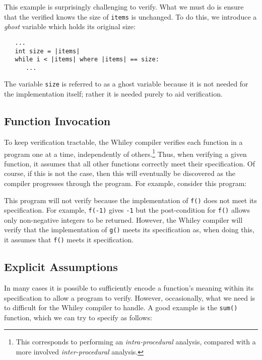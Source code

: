 

This example is surprisingly challenging to verify.  What we must do
is ensure that the verified knows the size of \lstinline{items} is
unchanged.  To do this, we introduce a {\em ghost} variable which
holds its original size:

\begin{lstlisting}
   ...
   int size = |items|
   while i < |items| where |items| == size:
      ...
\end{lstlisting}

The variable \lstinline{size} is referred to as a ghost variable
because it is not needed for the implementation itself; rather it is
needed purely to aid verification.

\subsection{Function Invocation}

To keep verification tractable, the Whiley compiler verifies each
function in a program one at a time, independently of
others.\footnote{This corresponds to performing an {\em
    intra-procedural} analysis, compared with a more involved {\em
    inter-procedural} analysis.}  Thus, when verifying a given
function, it assumes that all other functions correctly meet their
specification.  Of course, if this is not the case, then this will
eventually be discovered as the compiler progresses through the
program.  For example, consider this program:



This program will not verify because the implementation of
\lstinline{f()} does not meet its specification.  For example,
\lstinline{f(-1)} gives \lstinline{-1} but the post-condition for
\lstinline{f()} allows only non-negative integers to be returned.
However, the Whiley compiler will verify that the implementation of
\lstinline{g()} meets its specification as, when doing this, it
assumes that \lstinline{f()} meets it specification.

\subsection{Explicit Assumptions}

In many cases it is possible to sufficiently encode a function's meaning within its specification to allow a program to verify.  However, occasionally, what we need is to difficult for the Whiley compiler to handle.  A good example is the \lstinline{sum()} function, which we can try to specify as follows:


